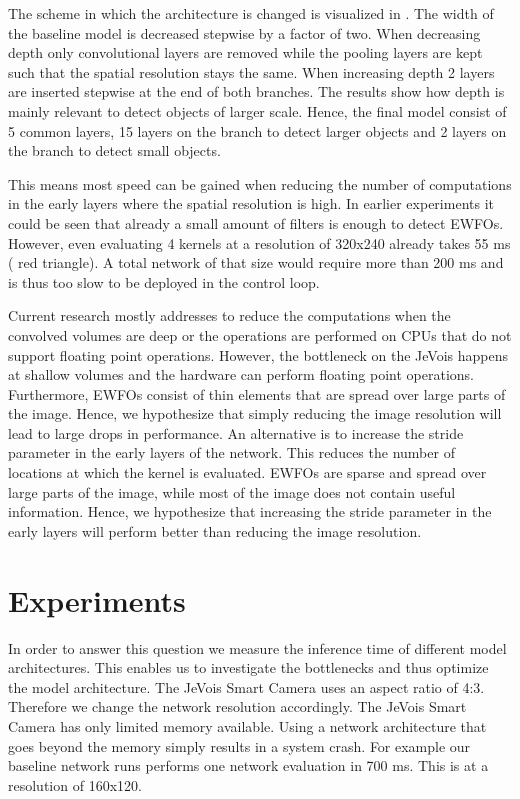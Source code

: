 The scheme in which the architecture is changed is visualized in . The width of the baseline model is decreased stepwise by a factor of two. When decreasing depth only convolutional layers are removed while the pooling layers are kept such that the spatial resolution stays the same. When increasing depth 2 layers are inserted stepwise at the end of both branches. The results show how depth is mainly relevant to detect objects of larger scale. Hence, the final model consist of 5 common layers, 15 layers on the branch to detect larger objects and 2 layers on the branch to detect small objects.


This means most speed can be gained when reducing the number of computations in the early layers where the spatial resolution is high. In earlier experiments it could be seen that already a small amount of filters is enough to detect \acp{EWFO}. However, even evaluating 4 kernels at a resolution of 320x240 already takes 55 ms ( red triangle). A total network of that size would require more than 200 ms and is thus too slow to be deployed in the control loop.

Current research mostly addresses to reduce the computations when the convolved volumes are deep or the operations are performed on \acp{CPU} that do not support floating point operations. However, the bottleneck on the JeVois happens at shallow volumes and the hardware can perform floating point operations. Furthermore, \acp{EWFO} consist of thin elements that are spread over large parts of the image. Hence, we hypothesize that simply reducing the image resolution will lead to large drops in performance. An alternative is to increase the stride parameter in the early layers of the network. This reduces the number of locations at which the kernel is evaluated. \acp{EWFO} are sparse and spread over large parts of the image, while most of the image does not contain useful information. Hence, we hypothesize that increasing the stride parameter in the early layers will perform better than reducing the image resolution.

\section{Experiments}

In order to answer this question we measure the inference time of different model architectures. This enables us to investigate the bottlenecks and thus optimize the model architecture. The JeVois Smart Camera uses an aspect ratio of 4:3. Therefore we change the network resolution accordingly. The JeVois Smart Camera has only limited memory available. Using a network architecture that goes beyond the memory simply results in a system crash. For example our baseline network runs performs one network evaluation in 700 ms. This is at a resolution of 160x120.

